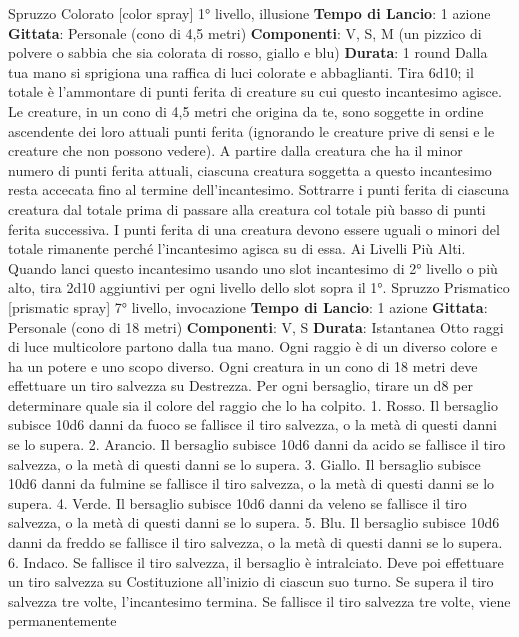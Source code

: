 \begin{multicols}{2}
Spruzzo Colorato
[color spray]
1° livello, illusione
\textbf{Tempo di Lancio}: 1 azione
\textbf{Gittata}: Personale (cono di 4,5 metri)
\textbf{Componenti}: V, S, M (un pizzico di polvere o sabbia
che sia colorata di rosso, giallo e blu)
\textbf{Durata}: 1 round
Dalla tua mano si sprigiona una raffica di luci colorate e
abbaglianti. Tira 6d10; il totale è l’ammontare di punti
ferita di creature su cui questo incantesimo agisce. Le
creature, in un cono di 4,5 metri che origina da te, sono
soggette in ordine ascendente dei loro attuali punti
ferita (ignorando le creature prive di sensi e le creature
che non possono vedere).
A partire dalla creatura che ha il minor numero di punti
ferita attuali, ciascuna creatura soggetta a questo
incantesimo resta accecata fino al termine
dell’incantesimo. Sottrarre i punti ferita di ciascuna
creatura dal totale prima di passare alla creatura col
totale più basso di punti ferita successiva. I punti ferita
di una creatura devono essere uguali o minori del totale
rimanente perché l’incantesimo agisca su di essa.
Ai Livelli Più Alti. Quando lanci questo incantesimo
usando uno slot incantesimo di 2° livello o più alto, tira
2d10 aggiuntivi per ogni livello dello slot sopra il 1°.
Spruzzo Prismatico
[prismatic spray]
7° livello, invocazione
\textbf{Tempo di Lancio}: 1 azione
\textbf{Gittata}: Personale (cono di 18 metri)
\textbf{Componenti}: V, S
\textbf{Durata}: Istantanea
Otto raggi di luce multicolore partono dalla tua mano.
Ogni raggio è di un diverso colore e ha un potere e uno
scopo diverso. Ogni creatura in un cono di 18 metri
deve effettuare un tiro salvezza su Destrezza. Per ogni
bersaglio, tirare un d8 per determinare quale sia il
colore del raggio che lo ha colpito.
1. Rosso. Il bersaglio subisce 10d6 danni da fuoco se
fallisce il tiro salvezza, o la metà di questi danni se lo
supera.
2. Arancio. Il bersaglio subisce 10d6 danni da acido se
fallisce il tiro salvezza, o la metà di questi danni se lo
supera.
3. Giallo. Il bersaglio subisce 10d6 danni da fulmine se
fallisce il tiro salvezza, o la metà di questi danni se lo
supera.
4. Verde. Il bersaglio subisce 10d6 danni da veleno se
fallisce il tiro salvezza, o la metà di questi danni se lo
supera.
5. Blu. Il bersaglio subisce 10d6 danni da freddo se
fallisce il tiro salvezza, o la metà di questi danni se lo
supera.
6. Indaco. Se fallisce il tiro salvezza, il bersaglio è
intralciato. Deve poi effettuare un tiro salvezza su
Costituzione all’inizio di ciascun suo turno. Se supera il
tiro salvezza tre volte, l’incantesimo termina. Se fallisce
il tiro salvezza tre volte, viene permanentemente

\end{multicols}
